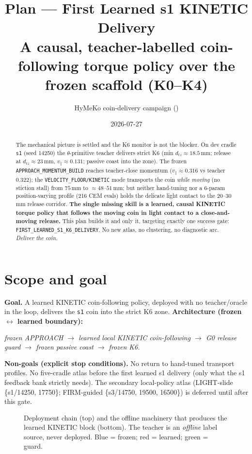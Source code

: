 \documentclass[11pt]{article}
\title{\textbf{Plan --- First Learned s1 KINETIC Delivery}\\[2pt]
\large A causal, teacher-labelled coin-following torque policy over the frozen scaffold (K0--K4)}
\author{HyMeKo coin-delivery campaign \quad(\code{recovery/coin-r9-causal-residual-delivery})}
\date{2026-07-27}
\newcommand{\code}[1]{\texttt{\small #1}}
\begin{document}
\maketitle

\begin{abstract}
\noindent The mechanical picture is settled and the K6 monitor is not the blocker. On dev cradle \code{s1}
(seed 14250) the $\theta$-primitive teacher delivers strict K6 (min $d_{tz}\!\approx\!18.5$\,mm; release at
$d_{tz}\!\approx\!23$\,mm, $v_\parallel\!\approx\!0.131$; passive coast into the zone). The frozen
\code{APPROACH\_MOMENTUM\_BUILD} reaches teacher-close momentum ($v_\parallel\!\approx\!0.316$ vs teacher $0.322$);
the \code{VELOCITY\_FLOOR/KINETIC} mode transports the coin \emph{while moving} (no stiction stall) from $75$\,mm to
$\approx\!48$--$51$\,mm; but neither hand-tuning nor a 6-param position-varying profile (216 CEM evals) holds the delicate
light contact to the $20$--$30$\,mm release corridor. \textbf{The single missing skill is a learned, causal KINETIC
torque policy that follows the moving coin in light contact to a close-and-moving release.} This plan builds it and only
it, targeting exactly one success gate: \code{FIRST\_LEARNED\_S1\_K6\_DELIVERY}. No new atlas, no clustering, no
diagnostic arc. \emph{Deliver the coin.}
\end{abstract}

\section{Scope and goal}
\textbf{Goal.} A learned KINETIC coin-following policy, deployed with no teacher/oracle in the loop, delivers the
\code{s1} coin into the strict K6 zone. \textbf{Architecture (frozen $\leftrightarrow$ learned boundary):}
\begin{center}\itshape frozen APPROACH $\rightarrow$ learned local KINETIC coin-following $\rightarrow$ G0 release guard
$\rightarrow$ frozen passive coast $\rightarrow$ frozen K6.\end{center}
\textbf{Non-goals (explicit stop conditions).} No return to hand-tuned transport profiles. No five-cradle atlas before
the first learned s1 delivery (only what the s1 feedback bank strictly needs). The secondary local-policy atlas
(LIGHT-slide \{s1/14250, 17750\}; FIRM-guided \{s3/14750, 19500, 16500\}) is deferred until after this gate.

\begin{figure}[h]\centering
\caption{Deployment chain (top) and the offline machinery that produces the learned KINETIC block (bottom). The teacher
is an \emph{offline} label source, never deployed. Blue = frozen; red = learned; green = guard.}\end{figure}
\end{document}
